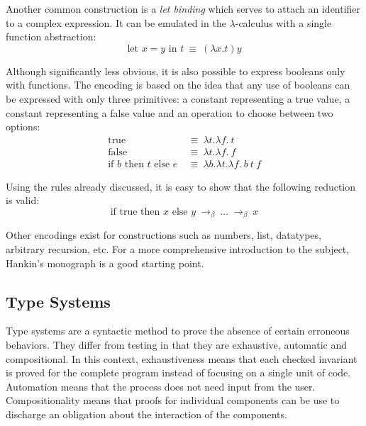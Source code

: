 Another common construction is a \emph{let binding} which serves to attach an identifier to a
complex expression. It can be emulated in the $\lambda$-calculus with a single function abstraction:
\begin{displaymath}
  \text{let } x = y \text{ in } t \: \equiv \: (\lambda x. t) y
\end{displaymath}

Although significantly less obvious, it is also possible to express booleans only with functions.
The encoding is based on the idea that any use of booleans can be expressed with only three
primitives: a constant representing a true value, a constant representing a false value and an
operation to choose between two options:
\begin{align*}
  \text{true}
    & \: \equiv \: \lambda t. \lambda f. \ t \\
  \text{false}
    & \: \equiv \: \lambda t. \lambda f. \ f \\
  \text{if } b \text{ then } t \text{ else } e
    & \: \equiv \: \lambda b. \lambda t. \lambda f. \ b \ t \ f
\end{align*}

Using the rules already discussed, it is easy to show that the following reduction is valid:
\begin{displaymath}
  \text{if true then } x \text{ else } y \: \to_\beta \: \dots \: \to_\beta \: x
\end{displaymath}

Other encodings exist for constructions such as numbers, list, datatypes, arbitrary recursion, etc.
For a more comprehensive introduction to the subject, Hankin's monograph \cite{hankin-2004-ILCCS} is
a good starting point.

\subsection{Type Systems}

Type systems are a syntactic method to prove the absence of certain erroneous behaviors. They differ
from testing in that they are exhaustive, automatic and compositional. In this context,
exhaustiveness means that each checked invariant is proved for the complete program instead of
focusing on a single unit of code. Automation means that the process does not need input from the
user. Compositionality means that proofs for individual components can be use to discharge an obligation
about the interaction of the components.

